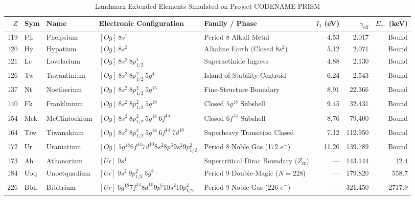 \documentclass[10pt,twocolumn,a4paper]{article}
\begin{document}
\begin{table}[t]
\centering
\footnotesize
\setlength{\tabcolsep}{1.9pt}
\caption{Landmark Extended Elements Simulated on Project CODENAME PRISM}
\label{tab:period8_9}
\begin{tabular}{rllllrrr}
\toprule
$Z$ & Sym & Name & Electronic Configuration & Family / Phase & $I_1$ (eV) & $\gamma_{\text{eff}}$ & $E_{e^+}$ (keV) \\
\midrule
119 & Ph  & Phelpsium    & $[Og]\ 8s^1$                                            & Period 8 Alkali Metal            & 4.53   & 2.017 & Bound \\
120 & Hy  & Hypatium     & $[Og]\ 8s^2$                                            & Alkaline Earth (Closed $8s^2$)   & 5.12   & 2.071 & Bound \\
121 & Lc  & Lovelacium   & $[Og]\ 8s^2\ 8p_{1/2}^1$                                & Superactinide Ingress            & 4.88   & 2.130 & Bound \\
126 & Tw  & Tawantinium  & $[Og]\ 8s^2\ 8p_{1/2}^2\ 5g^4$                          & Island of Stability Centroid     & 6.24   & 2.543 & Bound \\
137 & Nt  & Noetherium   & $[Og]\ 8s^2\ 8p_{1/2}^2\ 5g^{15}$                       & Fine-Structure Boundary       & 8.91   & 22.366 & Bound \\
140 & Fk  & Franklinium  & $[Og]\ 8s^2\ 8p_{1/2}^2\ 5g^{18}$                       & Closed $5g^{18}$ Subshell     & 9.45   & 32.431 & Bound \\
154 & Mck & McClintockium& $[Og]\ 8s^2\ 8p_{1/2}^2\ 5g^{18}\ 6f^{14}$               & Closed $6f^{14}$ Subshell     & 8.76   & 79.400 & Bound \\
164 & Tiw & Tiwanakium   & $[Og]\ 8s^2\ 8p_{1/2}^2\ 5g^{18}\ 6f^{14}\ 7d^{10}$     & Superheavy Transition Closed & 7.12 & 112.950 & Bound \\
172 & Ur  & Uraniatium   & $[Og]\ 5g^{18} 6f^{14} 7d^{10} 8s^2 8p^6 9s^2 9p_{1/2}^2$ & Period 8 Noble Gas (172 $e^-$) & 11.20 & 139.789 & Bound \\
173 & Ah  & Athanorium   & $[Ur]\ 9s^1$                                            & Supercritical Dirac Boundary ($Z_{\text{cr}}$) & --- & 143.144 & 12.4 \\
184 & Uoq & Unoctquadium & $[Ur]\ 9s^2\ 9p_{1/2}^2\ 6g^8$                          & Period 9 Double-Magic ($N=228$)  & ---    & 179.820 & 558.7 \\
226 & Bbh & Bibitrium    & $[Ur]\ 6g^{18} 7f^{14} 8d^{10} 9p^6 10s^2 10p_{1/2}^2$  & Period 9 Noble Gas (226 $e^-$) & --- & 321.450 & 2717.9 \\

\end{tabular}
\end{table}
\end{document}
